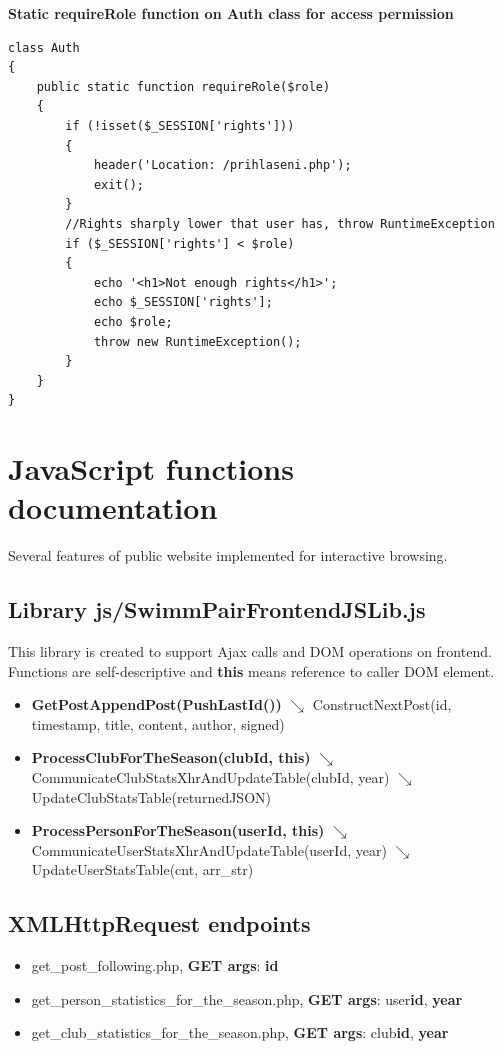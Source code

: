 \textbf{Static requireRole function on Auth class for access permission} 
\begin{lstlisting}
class Auth
{
	public static function requireRole($role)
	{
		if (!isset($_SESSION['rights']))
        {
			header('Location: /prihlaseni.php');
			exit();
		}
		//Rights sharply lower that user has, throw RuntimeException
		if ($_SESSION['rights'] < $role)
        {
			echo '<h1>Not enough rights</h1>';
			echo $_SESSION['rights'];
			echo $role;
			throw new RuntimeException();
		}
	}
}
\end{lstlisting}
\section{JavaScript functions documentation}
Several features of public website implemented for interactive browsing.
\subsection*{Library js/SwimmPairFrontendJSLib.js}
This library is created to support Ajax calls and DOM operations on frontend. Functions are self-descriptive and \textbf{this} means reference to caller DOM element.
\begin{itemize}
  \setlength\itemsep{0em}
  \item \textbf{GetPostAppendPost(PushLastId())}
  \newline    $\searrow$ ConstructNextPost(id, timestamp, title, content, author, signed)
  \item \textbf{ProcessClubForTheSeason(clubId, this)}
  \newline    $\searrow$ CommunicateClubStatsXhrAndUpdateTable(clubId, year)
  \newline    $\searrow$ UpdateClubStatsTable(returnedJSON)
  \item \textbf{ProcessPersonForTheSeason(userId, this)}
  \newline    $\searrow$ CommunicateUserStatsXhrAndUpdateTable(userId, year)
  \newline    $\searrow$ UpdateUserStatsTable(cnt, arr\_str)
\end{itemize}

\subsection*{XMLHttpRequest endpoints}
\begin{itemize}
    \item get\_post\_following.php, \textbf{GET args}: \textbf{id}
    \item get\_person\_statistics\_for\_the\_season.php, \textbf{GET args}: user\textunderscore \textbf{id}, \textbf{year}
    \item get\_club\_statistics\_for\_the\_season.php, \textbf{GET args}: club\textunderscore \textbf{id}, \textbf{year}
\end{itemize}

